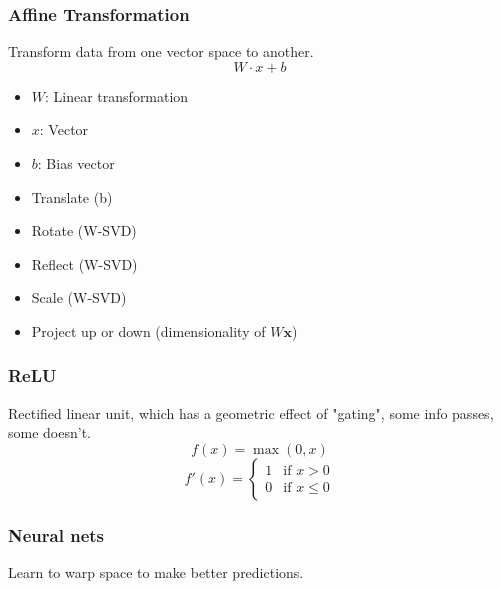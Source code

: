\subsubsection{Affine Transformation}
\begin{notes} Transform data from one vector space to another.
    \begin{equation}
        W \cdot x + b
    \end{equation}
    \begin{itemize}
        \item $W$: Linear transformation
        \item $x$: Vector
        \item $b$: Bias vector
    \end{itemize}
    \vspace{1em}

    \begin{itemize}
        \item Translate (b)
        \item Rotate (W-SVD)
        \item Reflect (W-SVD)
        \item Scale (W-SVD)
        \item Project up or down (dimensionality of $W \mathbf{x}$)
    \end{itemize}
\end{notes}

\subsubsection{ReLU}
\begin{notes} Rectified linear unit, which has a geometric effect of "gating", some info passes, some doesn't.
    \begin{equation*}
        f(x) = \max(0,x)
    \end{equation*}
    \begin{equation*}
        f'(x) = \begin{cases}
            1 & \text{if } x > 0 \\
            0 & \text{if } x \leq 0
        \end{cases}
    \end{equation*}
\end{notes}

\subsubsection{Neural nets}
\begin{notes} Learn to warp space to make better predictions.
\end{notes}
\newpage

